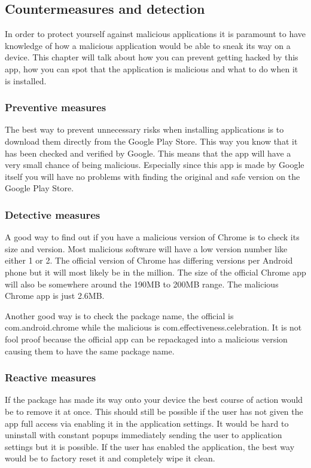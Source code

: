 \subsection{Countermeasures and detection}

In order to protect yourself against malicious applications it is paramount to have knowledge of how a malicious application would be able to sneak its way on a device. 
This chapter will talk about how you can prevent getting hacked by this app, how you can spot that the application is malicious and what to do when it is installed.

\subsubsection{Preventive measures}

The best way to prevent unnecessary risks when installing applications is to download them directly from the Google Play Store. 
This way you know that it has been checked and verified by Google. 
This means that the app will have a very small chance of being malicious. 
Especially since this app is made by Google itself you will have no problems with finding the original and safe version on the Google Play Store.

\subsubsection{Detective measures}

A good way to find out if you have a malicious version of Chrome is to check its size and version. 
Most malicious software will have a low version number like either 1 or 2. 
The official version of Chrome has differing versions per Android phone but it will most likely be in the million. 
The size of the official Chrome app will also be somewhere around the 190MB to 200MB range. The malicious Chrome app is just 2.6MB. 

Another good way is to check the package name, the official is com.android.chrome while the malicious is com.effectiveness.celebration. 
It is not fool proof because the official app can be repackaged into a malicious version causing them to have the same package name.

\subsubsection{Reactive measures}

If the package has made its way onto your device the best course of action would be to remove it at once. 
This should still be possible if the user has not given the app full access via enabling it in the application settings. 
It would be hard to uninstall with constant popups immediately sending the user to application settings but it is possible. 
If the user has enabled the application, the best way would be to factory reset it and completely wipe it clean.

